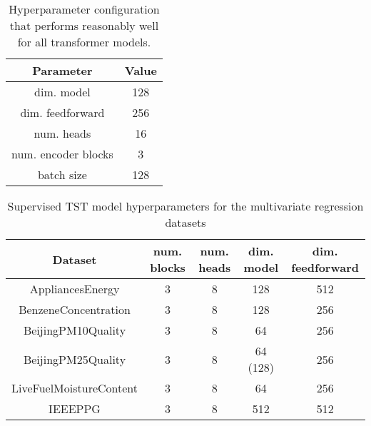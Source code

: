 \documentclass{article} \usepackage{iclr2021_conference,times}
\begin{document}
\begin{table}
\centering
\begin{tabular}{|c|c|} 
\hline
\textbf{Parameter}   & \textbf{Value}  \\ 
\hline
dim. model         & 128             \\
dim. feedforward & 256             \\
num. heads       & 16              \\
num. encoder blocks      & 3               \\
batch size & 128 \\
\hline
\end{tabular}
\caption{Hyperparameter configuration that performs reasonably well for all transformer models.}
\label{good_config}
\end{table}


\begin{table}
\centering
\begin{tabular}{|c|c|c|c|c|} 
\hline
Dataset                 & num. blocks & num. heads & dim. model & dim. feedforward  \\ 
\hline
AppliancesEnergy        & 3           & 8          & 128        & 512               \\
BenzeneConcentration    & 3           & 8          & 128        & 256               \\
BeijingPM10Quality      & 3           & 8          & 64         & 256               \\
BeijingPM25Quality      & 3           & 8          & 64 (128)         & 256               \\
LiveFuelMoistureContent & 3           & 8          & 64         & 256               \\
IEEEPPG                 & 3           & 8          & 512        & 512               \\
\hline
\end{tabular}
\caption{Supervised TST model hyperparameters for the multivariate regression datasets}
\label{tab:hyperparams_supervised_regression_datasets}
\end{table}
\end{document}
